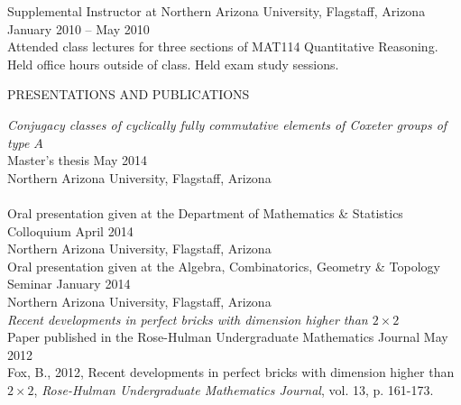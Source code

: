 \documentclass[10pt]{article}
\begin{document}
\noindent Supplemental Instructor at Northern Arizona University, Flagstaff, Arizona \hfill January 2010 -- May 2010 \\
\indent Attended class lectures for three sections of MAT114 Quantitative Reasoning. Held office hours outside of class. Held exam study sessions.


\vspace{2em}
\noindent \textsf{PRESENTATIONS AND PUBLICATIONS}
\vspace{8pt}

\noindent \emph{Conjugacy classes of cyclically fully commutative elements of Coxeter groups of type $A$} \\ %
    \indent Master's thesis \hfill May 2014 \\
    \indent Northern Arizona University, Flagstaff, Arizona \\
     \\
    
    \indent Oral presentation given at the Department of Mathematics \& Statistics Colloquium \hfill April 2014 \\
    \indent Northern Arizona University, Flagstaff, Arizona \\

    \indent Oral presentation given at the Algebra, Combinatorics, Geometry \& Topology Seminar \hfill January 2014 \\
    \indent Northern Arizona University, Flagstaff, Arizona \\

\noindent \emph{Recent developments in perfect bricks with dimension higher than $2 \times 2$} \\ %
	\indent Paper published in the Rose-Hulman Undergraduate Mathematics Journal \hfill May 2012 \\
	\indent Fox, B., 2012, Recent developments in perfect bricks with dimension higher than $2 \times 2$, \emph{Rose-Hulman Undergraduate Mathematics Journal}, vol. 13, p. 161-173.\\
	
\end{document}
